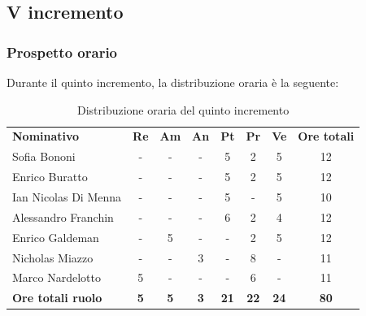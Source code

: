 \documentclass[../piano-di-progetto.tex]{subfiles}
\begin{document}
  \subsection{V incremento}

  \subsubsection{Prospetto orario}
 Durante il quinto incremento, la distribuzione oraria è la seguente:
  \begin{table}[H]
    \centering
    \begin{tabular}{lccccccc}
    \rowcolor{lightgray}
    \textbf{Nominativo}       & \textbf{Re} & \textbf{Am} & \textbf{An} & \textbf{Pt} & \textbf{Pr} & \textbf{Ve} & \textbf{Ore totali} \\
Sofia Bononi              & -           & -           & -           & 5           & 2           & 5           & 12                  \\
Enrico Buratto            & -           & -           & -           & 5           & 2           & 5           & 12                  \\
Ian Nicolas Di Menna      & -           & -           & -           & 5           & -           & 5           & 10                  \\
Alessandro Franchin       & -           & -           & -           & 6           & 2           & 4           & 12                  \\
Enrico Galdeman           & -           & 5           & -           & -           & 2           & 5           & 12                  \\
Nicholas Miazzo           & -           & -           & 3           & -           & 8           & -           & 11                  \\
Marco Nardelotto          & 5           & -           & -           & -           & 6           & -           & 11                  \\
\textbf{Ore totali ruolo} & \textbf{5}  & \textbf{5}  & \textbf{3}  & \textbf{21} & \textbf{22} & \textbf{24} & \textbf{80}        
    
    \end{tabular}
    \caption{Distribuzione oraria del quinto incremento}
  \end{table}
\end{document}

